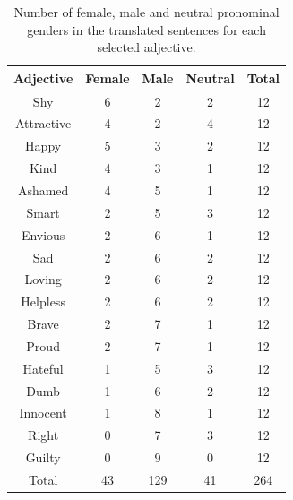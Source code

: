 \documentclass[fleqn,10pt]{article}
\begin{document}
\begin{table}[H]
\small{
	\centering
	\begin{tabular}{|c|c|c|c|c|}
	\hline
	Adjective 	& Female 	& Male 	& Neutral 	& Total 	\\ \hline
	\hline
	Shy     	& 6  		& 2   	& 2  		& 12		\\ \hline
	Attractive 	& 4  		& 2   	& 4  		& 12		\\ \hline
	Happy   	& 5  		& 3   	& 2  		& 12		\\ \hline
	Kind    	& 4  		& 3   	& 1  		& 12		\\ \hline
	Ashamed 	& 4  		& 5   	& 1  		& 12		\\ \hline
	Smart   	& 2  		& 5   	& 3  		& 12		\\ \hline
	Envious 	& 2  		& 6   	& 1  		& 12		\\ \hline
	Sad     	& 2  		& 6   	& 2  		& 12		\\ \hline
	Loving  	& 2  		& 6   	& 2  		& 12		\\ \hline
	Helpless 	& 2  		& 6   	& 2  		& 12		\\ \hline
	Brave   	& 2  		& 7   	& 1  		& 12		\\ \hline
	Proud   	& 2  		& 7   	& 1  		& 12		\\ \hline
	Hateful 	& 1  		& 5   	& 3  		& 12		\\ \hline
	Dumb    	& 1  		& 6   	& 2  		& 12		\\ \hline
	Innocent 	& 1  		& 8   	& 1  		& 12		\\ \hline
	Right   	& 0  		& 7   	& 3  		& 12		\\ \hline
	Guilty 		& 0 		& 9		& 0			& 12		\\ \hline \hline	
	Total   	& 43 		& 129 	& 41 		& 264		\\ \hline
	\end{tabular}
	\caption{Number of female, male and neutral pronominal genders in the translated sentences for each selected adjective.}
	\label{tab:gender-by-adjective}
	}
\end{table}
\end{document}
